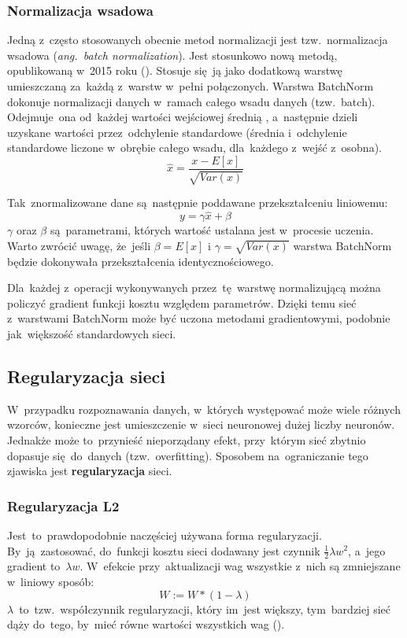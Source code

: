 \subsubsection{Normalizacja wsadowa}
Jedną z~często stosowanych obecnie metod normalizacji jest tzw.~normalizacja wsadowa (\textit{ang.~batch normalization}).
Jest stosunkowo nową metodą, opublikowaną w~2015 roku (\cite{batch-norm}). Stosuje się~ją jako
dodatkową warstwę umieszczaną za~każdą z~warstw w~pełni połączonych. Warstwa BatchNorm dokonuje normalizacji danych
w~ramach całego wsadu danych (tzw.~batch). Odejmuje~ona od~każdej wartości wejściowej średnią , a~następnie dzieli
uzyskane wartości przez~odchylenie standardowe (średnia i~odchylenie standardowe liczone w~obrębie całego wsadu,
dla~każdego z~wejść z~osobna).
\begin{equation*}
 \widehat{x} = \frac{x - E[x]}{\sqrt{Var(x)}}
\end{equation*}

Tak~znormalizowane dane są~następnie poddawane przekształceniu liniowemu:
\begin{equation*}
y = \gamma\widehat{x} + \beta
\end{equation*}
$\gamma$ oraz $\beta$ są~parametrami, których wartość ustalana jest w~procesie uczenia. Warto zwrócić uwagę, że~jeśli
$\beta=E[x]$ i $\gamma=\sqrt{Var(x)}$ warstwa BatchNorm będzie dokonywała przekształcenia identycznościowego.

Dla~każdej z~operacji wykonywanych przez~tę~warstwę normalizującą można policzyć gradient funkcji kosztu względem
parametrów. Dzięki temu sieć z~warstwami BatchNorm może być uczona metodami gradientowymi, podobnie jak~większość
standardowych sieci.

\subsection{Regularyzacja sieci}
W~przypadku rozpoznawania danych, w~których występować może wiele różnych wzorców, konieczne jest umieszczenie w~sieci
neuronowej dużej liczby neuronów. Jednakże może to~przynieść nieporządany efekt, przy~którym sieć zbytnio dopasuje
się~do~danych (tzw.~overfitting). Sposobem na~ograniczanie tego zjawiska jest \textbf{regularyzacja} sieci.

\subsubsection{Regularyzacja L2} \label{sssec:reg_L2}
Jest~to~prawdopodobnie naczęściej używana forma regularyzacji. By~ją~zastosować, do~funkcji kosztu sieci dodawany
jest czynnik $\frac{1}{2}\lambda w^2$, a~jego gradient to~$\lambda w$. W~efekcie przy~aktualizacji wag wszystkie
z~nich są zmniejszane w~liniowy sposób:
\begin{equation*}
W := W*(1 -\lambda)
\end{equation*}
$\lambda$~to~tzw.~współczynnik regularyzacji, który im~jest większy, tym~bardziej sieć dąży do~tego,
by~mieć równe wartości wszystkich wag (\cite{L2-regularization}).

